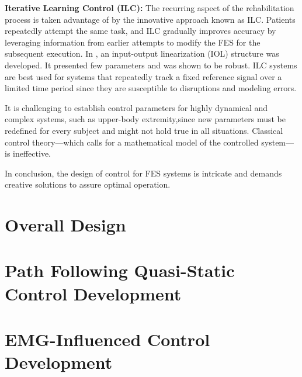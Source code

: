 \textbf{Iterative Learning Control (ILC):} The recurring aspect of the rehabilitation process is taken advantage of by the innovative approach known as ILC. Patients repeatedly attempt the same task, and ILC gradually improves accuracy by leveraging information from earlier attempts to modify the FES for the subsequent execution. In \cite{IOL}, an input-output linearization (IOL) structure was developed. It presented few parameters and was shown to be robust.  ILC systems are best used for systems that repeatedly track a fixed reference signal over a limited time period since they are susceptible to disruptions and modeling errors.

It is challenging to establish control parameters for highly dynamical and complex systems, such as upper-body extremity,since new parameters must be redefined for every subject and might not hold true in all situations. Classical control theory—which calls for a mathematical model of the controlled system—is ineffective.

In conclusion, the design of control for FES systems is intricate and demands creative solutions to assure optimal operation.

\section{Overall Design}


\section{Path Following Quasi-Static Control Development }

\section{EMG-Influenced Control Development}
